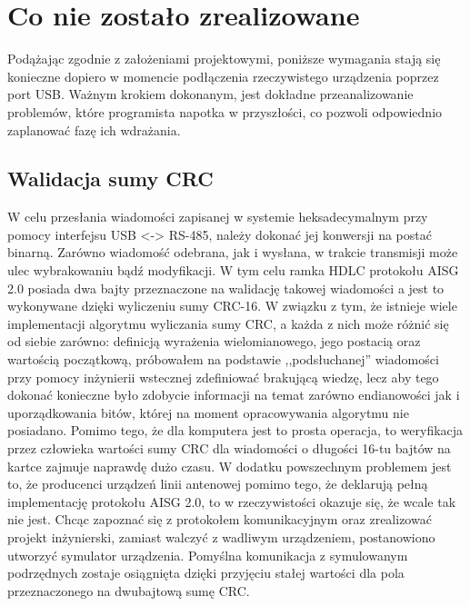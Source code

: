 
    \section{Co nie zostało zrealizowane}
    Podążając zgodnie z założeniami projektowymi, poniższe wymagania stają się konieczne dopiero w momencie podłączenia rzeczywistego urządzenia
    poprzez port USB. Ważnym krokiem dokonanym, jest dokładne przeanalizowanie problemów, które programista napotka w przyszłości,
    co pozwoli odpowiednio zaplanować fazę ich wdrażania.


    \subsection{Walidacja sumy CRC}
    W celu przesłania wiadomości zapisanej w systemie heksadecymalnym przy pomocy interfejsu USB <-> RS-485,
    należy dokonać jej konwersji na postać binarną. Zarówno wiadomość odebrana, jak i wysłana, w trakcie transmisji może ulec wybrakowaniu bądź
    modyfikacji. W tym celu ramka HDLC protokołu AISG 2.0 posiada dwa bajty przeznaczone na walidację takowej wiadomości a jest to wykonywane
    dzięki wyliczeniu sumy CRC-16. W związku z tym, że istnieje wiele implementacji algorytmu wyliczania sumy CRC, a każda z nich może różnić się od siebie zarówno:
    definicją wyrażenia wielomianowego, jego postacią oraz wartością początkową, próbowałem na podstawie ,,podsłuchanej'' wiadomości przy pomocy
    inżynierii wstecznej zdefiniować brakującą wiedzę, lecz aby tego dokonać konieczne było zdobycie informacji na temat zarówno endianowości
    jak i uporządkowania bitów, której na moment opracowywania algorytmu nie posiadano. Pomimo tego, że dla komputera jest to prosta operacja, to weryfikacja przez człowieka
    wartości sumy CRC dla wiadomości o długości 16-tu bajtów na kartce zajmuje naprawdę dużo czasu. W dodatku powszechnym problemem jest to, że 
    producenci urządzeń linii antenowej pomimo tego, że deklarują pełną implementację protokołu AISG 2.0, to w rzeczywistości okazuje się, że
    wcale tak nie jest. Chcąc zapoznać się z protokołem komunikacyjnym oraz zrealizować projekt inżynierski, zamiast walczyć z
    wadliwym urządzeniem, postanowiono utworzyć symulator urządzenia. Pomyślna komunikacja z symulowanym podrzędnych zostaje osiągnięta dzięki przyjęciu stałej wartości
    dla pola przeznaczonego na dwubajtową sumę CRC.
   
